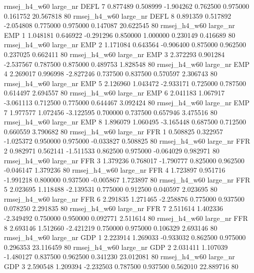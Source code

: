 rmsej_h4_w60   large_nr     DEFL                 7  0.877489  0.508999  -1.904262 0.762500 0.975000  0.161752   20.567818 80
rmsej_h4_w60   large_nr     DEFL                 8  0.891359  0.517892  -2.054808 0.775000 0.975000  0.147087   20.622545 80
rmsej_h4_w60   large_nr      EMP                 1  1.048181  0.646922  -0.291296 0.850000 1.000000  0.230149    0.416689 80
rmsej_h4_w60   large_nr      EMP                 2  1.171084  0.643564  -0.906400 0.875000 0.962500  0.237025    0.662411 80
rmsej_h4_w60   large_nr      EMP                 3  2.372293  0.901284  -2.537567 0.787500 0.875000  0.489753    1.828548 80
rmsej_h4_w60   large_nr      EMP                 4  2.269017  0.996998  -2.827246 0.737500 0.837500  0.570597    2.306743 80
rmsej_h4_w60   large_nr      EMP                 5  2.126960  1.043472  -2.933171 0.725000 0.787500  0.614497    2.694557 80
rmsej_h4_w60   large_nr      EMP                 6  2.041183  1.067917  -3.061113 0.712500 0.775000  0.644467    3.092424 80
rmsej_h4_w60   large_nr      EMP                 7  1.977577  1.072456  -3.122595 0.700000 0.737500  0.657946    3.475516 80
rmsej_h4_w60   large_nr      EMP                 8  1.896079  1.060495  -3.165448 0.687500 0.712500  0.660559    3.790682 80
rmsej_h4_w60   large_nr      FFR                 1  0.508825  0.322957  -1.025372 0.950000 0.975000 -0.033827    0.508825 80
rmsej_h4_w60   large_nr      FFR                 2  0.982971  0.562141  -1.511533 0.862500 0.975000 -0.064029    0.982971 80
rmsej_h4_w60   large_nr      FFR                 3  1.379236  0.768017  -1.790777 0.825000 0.962500 -0.046147    1.379236 80
rmsej_h4_w60   large_nr      FFR                 4  1.723897  0.951716  -1.991218 0.800000 0.937500 -0.005867    1.723897 80
rmsej_h4_w60   large_nr      FFR                 5  2.023695  1.118488  -2.139531 0.775000 0.912500  0.040597    2.023695 80
rmsej_h4_w60   large_nr      FFR                 6  2.291835  1.271465  -2.258876 0.775000 0.937500  0.078250    2.291835 80
rmsej_h4_w60   large_nr      FFR                 7  2.511614  1.402336  -2.349492 0.750000 0.950000  0.092771    2.511614 80
rmsej_h4_w60   large_nr      FFR                 8  2.693146  1.512660  -2.421219 0.750000 0.975000  0.106329    2.693146 80
rmsej_h4_w60   large_nr      GDP                 1  2.223914  1.269033  -0.933032 0.862500 0.975000  0.296353   23.116459 80
rmsej_h4_w60   large_nr      GDP                 2  2.031411  1.107039  -1.480127 0.837500 0.962500  0.341230   23.012081 80
rmsej_h4_w60   large_nr      GDP                 3  2.590548  1.209394  -2.232503 0.787500 0.937500  0.562010   22.889716 80
